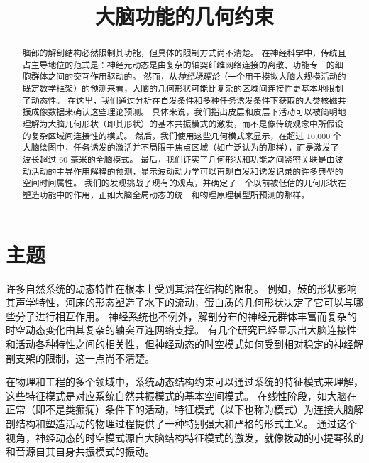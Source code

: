 \documentclass[lang=cn,a4paper,newtx,citestyle=gb7714-2015, bibstyle=gb7714-2015]{elegantpaper}
\title{大脑功能的几何约束}
\date{}
\begin{document}
\maketitle

\begin{abstract}
脑部的解剖结构必然限制其功能，但具体的限制方式尚不清楚。
在神经科学中，传统且占主导地位的范式是：神经元动态是由复杂的轴突纤维网络连接的离散、功能专一的细胞群体之间的交互作用驱动的。
然而，从\textit{神经场理论}（一个用于模拟大脑大规模活动的既定数学框架）的预测来看，大脑的几何形状可能比复杂的区域间连接性更基本地限制了动态性。
在这里，我们通过分析在自发条件和多种任务诱发条件下获取的人类核磁共振成像数据来确认这些理论预测。
具体来说，我们指出皮层和皮层下活动可以被简明地理解为大脑几何形状（即其形状）的基本共振模式的激发，而不是像传统观念中所假设的复杂区域间连接性的模式。
然后，我们使用这些几何模式来显示，在超过 10,000 个大脑绘图中，任务诱发的激活并不局限于焦点区域（如广泛认为的那样），而是激发了波长超过 60 毫米的全脑模式。
最后，我们证实了几何形状和功能之间紧密关联是由波动活动的主导作用解释的预测，显示波动动力学可以再现自发和诱发记录的许多典型的空间时间属性。
我们的发现挑战了现有的观点，并确定了一个以前被低估的几何形状在塑造功能中的作用，正如大脑全局动态的统一和物理原理模型所预测的那样。
\end{abstract}

\section{主题}

许多自然系统的动态特性在根本上受到其潜在结构的限制。
例如，鼓的形状影响其声学特性，河床的形态塑造了水下的流动，蛋白质的几何形状决定了它可以与哪些分子进行相互作用\cite{yang2018geometric}。
神经系统也不例外，解剖分布的神经元群体丰富而复杂的时空动态变化由其复杂的轴突互连网络支撑\cite{nowack1995neocortical,braitenberg2013cortex}。
有几个研究已经显示出大脑连接性和活动各种特性之间的相关性\cite{damoiseaux2009greater}，但神经动态的时空模式如何受到相对稳定的神经解剖支架的限制，这一点尚不清楚。


在物理和工程的多个领域中，系统动态结构约束可以通过系统的特征模式来理解，这些特征模式是对应系统自然共振模式的基本空间模式\cite{melrose1991electromagnetic}。
在线性阶段，如大脑在正常（即不是类癫痫）条件下的活动\cite{nozari2020brain}，特征模式（以下也称为模式）为连接大脑解剖结构和塑造活动的物理过程提供了一种特别强大和严格的形式主义。
通过这个视角，神经动态的时空模式源自大脑结构特征模式的激发，就像拨动的小提琴弦的和音源自其自身共振模式的振动。
\end{document}
